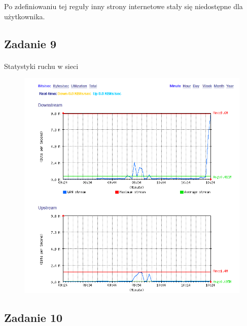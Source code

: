 \documentclass[wide,a4paper,titlepage,12pt] {article}
\begin{document}
  Po zdefiniowaniu tej reguły inny strony internetowe stały się niedostępne dla użytkownika.


  \subsection{Zadanie 9}
  \paragraph{}
  Statystyki ruchu w sieci
  \begin{figure}[h!]
    \begin{center}
      \includegraphics[width=\textwidth]{9.PNG}
    \end{center}
  \end{figure}


  \newpage
  \subsection{Zadanie 10}
\end{document}
